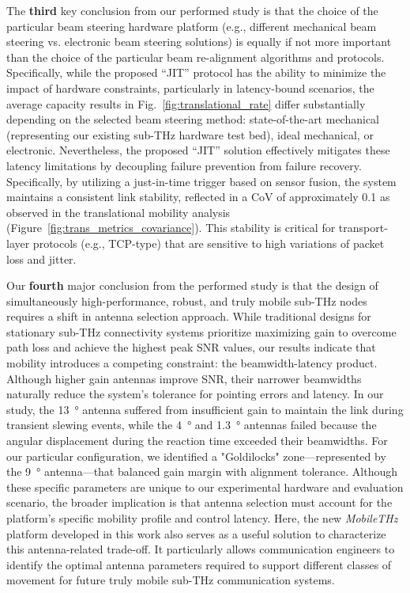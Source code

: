 \documentclass[fleqn,10pt]{wlscirep}
\begin{document}
The \textbf{third} key conclusion from our performed study is that the choice of the particular beam steering hardware platform (e.g., different mechanical beam steering vs. electronic beam steering solutions) is equally if not more important than the choice of the particular beam re-alignment algorithms and protocols. Specifically, while the proposed ``JIT'' protocol has the ability to minimize the impact of hardware constraints, particularly in latency-bound scenarios, the average capacity results in Fig.~\ref{fig:translational_rate} differ substantially depending on the selected beam steering method: state-of-the-art mechanical (representing our existing sub-THz hardware test bed), ideal mechanical, or electronic. Nevertheless, the proposed ``JIT'' solution effectively mitigates these latency limitations by decoupling failure prevention from failure recovery. Specifically, by utilizing a just-in-time trigger based on sensor fusion, the system maintains a consistent link stability, reflected in a CoV of approximately 0.1 as observed in the translational mobility analysis (Figure~\ref{fig:trans_metrics_covariance}). This stability is critical for transport-layer protocols (e.g., TCP-type) that are sensitive to high variations of packet loss and jitter\cite{10.1145/52325.52356}.

Our \textbf{fourth} major conclusion from the performed study is that the design of simultaneously high-performance, robust, and truly mobile sub-THz nodes requires a shift in antenna selection approach. While traditional designs for stationary sub-THz connectivity systems prioritize maximizing gain to overcome path loss and achieve the highest peak SNR values, our results indicate that mobility introduces a competing constraint: the beamwidth-latency product. Although higher gain antennas improve SNR, their narrower beamwidths naturally reduce the system's tolerance for pointing errors and latency. In our study, the \SI{13}{\degree} antenna suffered from insufficient gain to maintain the link during transient slewing events, while the \SI{4}{\degree} and \SI{1.3}{\degree} antennas failed because the angular displacement during the reaction time exceeded their beamwidths. For our particular configuration, we identified a "Goldilocks" zone—represented by the \SI{9}{\degree} antenna—that balanced gain margin with alignment tolerance. Although these specific parameters are unique to our experimental hardware and evaluation scenario, the broader implication is that antenna selection must account for the platform's specific mobility profile and control latency. Here, the new \emph{MobileTHz} platform developed in this work also serves as a useful solution to characterize this antenna-related trade-off. It particularly allows communication engineers to identify the optimal antenna parameters required to support different classes of movement for future truly mobile sub-THz communication systems.
\end{document}
